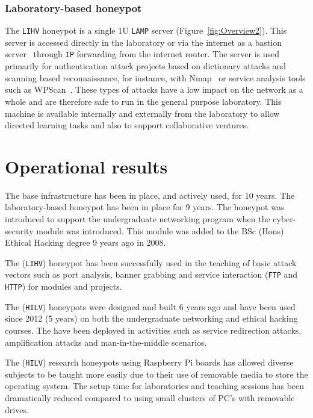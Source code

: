 \subsubsection{Laboratory-based honeypot}

The \texttt{LIHV} honeypot is a single 1U \texttt{LAMP} server
(Figure~\ref{fig:Overview2}). This server is accessed directly in the
laboratory or via the internet as a bastion server~\cite{MB:05} through
\texttt{IP} forwarding from the internet router. The server is used primarily
for authentication attack projects based on dictionary attacks and scanning
based reconnaissance, for instance, with Nmap~\cite{GFL:09} or service analysis
tools such as WPScan~\cite{WT:17}. These types of attacks have a low impact on
the network as a whole and are therefore safe to run in the general purpose
laboratory. This machine is available internally and externally from the
laboratory to allow directed learning tasks and also to support collaborative
ventures.

\section{Operational results}\label{Results}

The base infrastructure has been in place, and actively used, for 10 years. The
laboratory-based honeypot has been in place for 9 years. The honeypot was
introduced to support the undergraduate networking program when the
cyber-security module was introduced. This module was added to the BSc (Hons)
Ethical Hacking degree 9 years ago in 2008.

The (\texttt{LIHV}) honeypot has been successfully used in the teaching of
basic attack vectors such as port analysis, banner grabbing and service
interaction (\texttt{FTP} and \texttt{HTTP}) for modules and projects.

The (\texttt{HILV}) honeypots were designed and built 6 years ago and have been
used since 2012 (5 years) on both the undergraduate networking and ethical
hacking courses. The have been deployed in activities such as service
redirection attacks, amplification attacks and man-in-the-middle scenarios.

The (\texttt{HILV}) research honeypots using Raspberry Pi boards has allowed
diverse subjects to be taught more easily due to their use of removable media
to store the operating system. The setup time for laboratories and teaching
sessions has been dramatically reduced compared to using small clusters of PC's
with removable drives.

